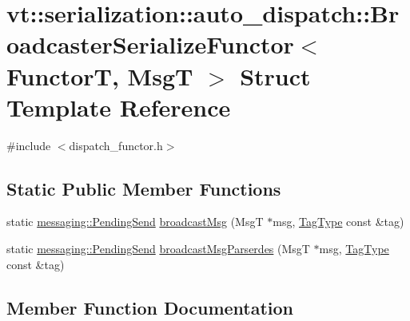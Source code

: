 \hypertarget{structvt_1_1serialization_1_1auto__dispatch_1_1_broadcaster_serialize_functor}{}\section{vt\+:\+:serialization\+:\+:auto\+\_\+dispatch\+:\+:Broadcaster\+Serialize\+Functor$<$ FunctorT, MsgT $>$ Struct Template Reference}
\label{structvt_1_1serialization_1_1auto__dispatch_1_1_broadcaster_serialize_functor}


{\ttfamily \#include $<$dispatch\+\_\+functor.\+h$>$}

\subsection*{Static Public Member Functions}
\begin{DoxyCompactItemize}
\item 
static \hyperlink{structvt_1_1messaging_1_1_pending_send}{messaging\+::\+Pending\+Send} \hyperlink{structvt_1_1serialization_1_1auto__dispatch_1_1_broadcaster_serialize_functor_ac7f1de6c6fcfc642d5d7aaa9eb459788}{broadcast\+Msg} (MsgT $\ast$msg, \hyperlink{namespacevt_a84ab281dae04a52a4b243d6bf62d0e52}{Tag\+Type} const \&tag)
\item 
static \hyperlink{structvt_1_1messaging_1_1_pending_send}{messaging\+::\+Pending\+Send} \hyperlink{structvt_1_1serialization_1_1auto__dispatch_1_1_broadcaster_serialize_functor_a8dc424915a94365ac4247d686d35fcc1}{broadcast\+Msg\+Parserdes} (MsgT $\ast$msg, \hyperlink{namespacevt_a84ab281dae04a52a4b243d6bf62d0e52}{Tag\+Type} const \&tag)
\end{DoxyCompactItemize}


\subsection{Member Function Documentation}
\mbox{\label{structvt_1_1serialization_1_1auto__dispatch_1_1_broadcaster_serialize_functor_ac7f1de6c6fcfc642d5d7aaa9eb459788}} 
